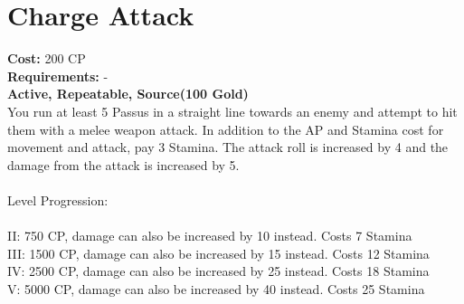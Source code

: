 \section{Charge Attack}
\textbf{Cost:} 200 CP\\
\textbf{Requirements:} -\\
\textbf{Active, Repeatable, Source(100 Gold)}\\
You run at least 5 Passus in a straight line towards an enemy and attempt to hit them with a melee weapon attack. In addition to the AP and Stamina cost for movement and attack, pay 3 Stamina. The attack roll is increased by 4 and the damage from the attack is increased by 5.\\
\\
Level Progression:\\
\\
II: 750 CP, damage can also be increased by 10 instead. Costs 7 Stamina\\
III: 1500 CP, damage can also be increased by 15 instead. Costs 12 Stamina\\
IV: 2500 CP, damage can also be increased by 25 instead. Costs 18 Stamina\\
V: 5000 CP, damage can also be increased by 40 instead. Costs 25 Stamina\\